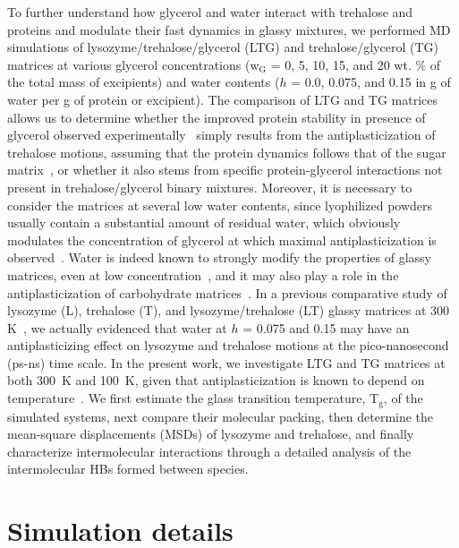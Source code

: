 \documentclass[journal=jpcbfk,manuscript=article]{achemso}
\begin{document}
\begin{singlespacing}
To further understand how glycerol and water interact with trehalose and proteins and modulate their fast dynamics 
in glassy mixtures, we performed MD simulations of lysozyme/trehalose/glycerol (LTG) and trehalose/glycerol (TG) matrices at various 
glycerol concentrations (w$_{\textrm{G}}$ = 0, 5, 10, 15, and 20 wt. \% of the total mass of excipients) and water contents 
($h$ = 0.0, 0.075, and 0.15 in g of water per g of protein or excipient).
The comparison of LTG and TG matrices allows us to determine whether the improved protein stability in presence of glycerol
observed experimentally~\cite{Cicerone2004,Cicerone2012} simply results from the antiplasticization of trehalose motions, 
assuming that the protein dynamics follows that of the sugar matrix~\cite{Caliskan2004,Cornicchi2006}, or whether it also stems 
from specific protein-glycerol interactions not present in trehalose/glycerol binary mixtures. 
Moreover, it is necessary to consider the matrices at several 
low water contents, since lyophilized powders usually contain a substantial amount of residual water, which obviously 
modulates the concentration of glycerol at which maximal antiplasticization is observed~\cite{Anopchenko2006}. 
Water is indeed known to strongly modify the properties of glassy matrices, even at 
low concentration~\cite{Roos1991b,Hancock1994,Seow1999,Verbeek2010}, and it may also play a role in the antiplasticization 
of carbohydrate matrices~\cite{Lourdin1997,Townrow2010,Roussenova2010,Roussenova2014,Roussenova2014b,Ubbink2016}. 
In a previous comparative study of lysozyme (L), trehalose (T), and lysozyme/trehalose (LT) glassy matrices at 
300 K~\cite{Lerbret2012}, we actually evidenced that water at $h$ = 0.075 and 0.15 may have an antiplasticizing effect on 
lysozyme and trehalose motions at the pico-nanosecond (ps-ns) time scale. In the present work, we investigate LTG and TG matrices 
at both 300~K and 100~K, given that antiplasticization is known to depend on temperature~\cite{Anopchenko2006,Obrzut2010}. 
We first estimate the glass transition temperature, T$_{\textrm{g}}$, of the simulated systems, next compare their molecular 
packing, then determine the mean-square displacements (MSDs) of lysozyme and trehalose, and finally characterize intermolecular 
interactions through a detailed analysis of the intermolecular HBs formed between species.

\newpage

\section{Simulation details}


\end{singlespacing}
\end{document}
